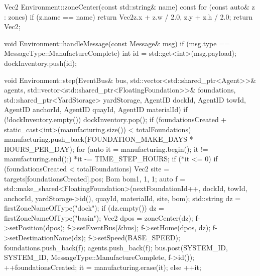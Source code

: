 \documentclass[10pt,letterpaper]{jsarticle}
\begin{document}
\begin{cppcode}
Vec2 Environment::zoneCenter(const std::string& name) const {
    for (const auto& z : zones) {
        if (z.name == name) {
            return Vec2{z.x + z.w / 2.0, z.y + z.h / 2.0};
        }
    }
    return Vec2{};
}

void Environment::handleMessage(const Message& msg) {
    if (msg.type == MessageType::ManufactureComplete) {
        int id = std::get<int>(msg.payload);
        dockInventory.push(id);
    }
}

void Environment::step(EventBus& bus,
                       std::vector<std::shared_ptr<Agent>>& agents,
                       std::vector<std::shared_ptr<FloatingFoundation>>& foundations,
                       std::shared_ptr<YardStorage> yardStorage,
                       AgentID dockId, AgentID towId, AgentID anchorId,
                       AgentID quayId, AgentID materialId) {
    if (!dockInventory.empty()) {
        dockInventory.pop();
        if (foundationsCreated + static_cast<int>(manufacturing.size()) < totalFoundations) {
            manufacturing.push_back(FOUNDATION_MAKE_DAYS * HOURS_PER_DAY);
        }
    }
    for (auto it = manufacturing.begin(); it != manufacturing.end();) {
        *it -= TIME_STEP_HOURS;
        if (*it <= 0) {
            if (foundationsCreated < totalFoundations) {
                Vec2 site = targets[foundationsCreated].pos;
                Bom bom{1, 1, 1};
                auto f = std::make_shared<FloatingFoundation>(nextFoundationId++, dockId, towId, anchorId,
                                                              yardStorage->id(), quayId, materialId, site, bom);
                std::string dz = firstZoneNameOfType("dock");
                if (dz.empty()) dz = firstZoneNameOfType("basin");
                Vec2 dpos = zoneCenter(dz);
                f->setPosition(dpos);
                f->setEventBus(&bus);
                f->setHome(dpos, dz);
                f->setDestinationName(dz);
                f->setSpeed(BASE_SPEED);
                foundations.push_back(f);
                agents.push_back(f);
                bus.post({SYSTEM_ID, SYSTEM_ID, MessageType::ManufactureComplete, f->id()});
                ++foundationsCreated;
            }
            it = manufacturing.erase(it);
        } else {
            ++it;
        }
    }
}
\end{cppcode}
\end{document}
